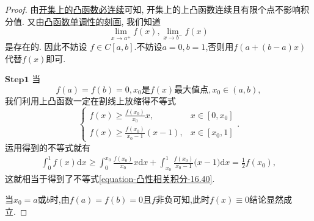 \documentclass[../../main.tex]{subfiles}
\begin{document}
\begin{proof}
由\hyperref[corollary:开集上的下凸函数必连续]{开集上的凸函数必连续}可知, 开集上的上凸函数连续且有限个点不影响积分值. 又由\hyperref[proposition:下凸函数的单调性刻画]{凸函数单调性的刻画}, 我们知道
\[\lim_{x \to a^+}f(x), \lim_{x \to b^-}f(x)\]
是存在的. 因此不妨设 $f \in C[a,b]$.不妨设$a=0,b=1$,否则用$f(a+(b-a)x)$代替$f(x)$即可.

$\mathbf{Step}\mathbf{1}$ 当
\[f(a) = f(b) = 0, x_0\text{是}f(x)\text{最大值点}, x_0 \in (a,b),\]
我们利用上凸函数一定在割线上放缩得不等式
\[
\begin{cases}
f(x) \geqslant   \frac{f(x_0) }{x_0 }x, &x \in [0,x_0]\\
f(x) \geqslant \frac{f(x_0) }{x_0 - 1}(x - 1), &x \in [x_0,1]
\end{cases}.
\]
运用得到的不等式就有
\begin{align*}
\int_0^1{f(x)\mathrm{d}x\geqslant \int_0^{x_0}{\frac{f(x_0)}{x_0}x}}\mathrm{d}x+\int_{x_0}^1{\frac{f(x_0)}{x_0-1}(x}-1)\mathrm{d}x=\frac{1}{2}f(x_0),
\end{align*}
这就相当于得到了不等式\eqref{equation-凸性相关积分-16.40}.

当$x_0=a\text{或}b$时,由$f(a)=f(b)=0$且$f$非负可知,此时$f(x)\equiv 0$结论显然成立.


\end{proof}
\end{document}
